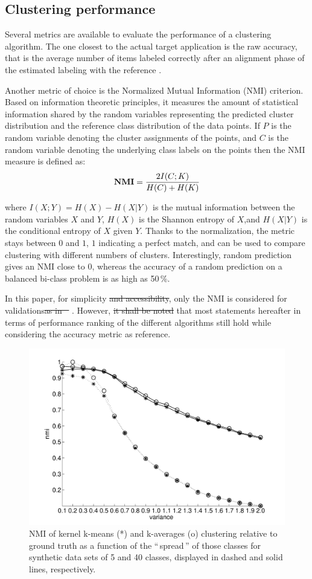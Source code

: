 \documentclass[natbib,smallextended]{svjour3}
\newcommand{\gl}[1]{``\,#1\,''} %
\providecommand{\DIFaddtex}[1]{{\protect\color{blue}\uwave{#1}}} %
\providecommand{\DIFdeltex}[1]{{\protect\color{red}\sout{#1}}}                      %
\providecommand{\DIFaddbegin}{} %
\providecommand{\DIFaddend}{} %
\providecommand{\DIFdelbegin}{} %
\providecommand{\DIFdelend}{} %
\providecommand{\DIFadd}[1]{\texorpdfstring{\DIFaddtex{#1}}{#1}} %
\providecommand{\DIFdel}[1]{\texorpdfstring{\DIFdeltex{#1}}{}} %
\begin{document}
\subsection{Clustering performance}

Several metrics are available to evaluate the performance of a clustering algorithm. The one closest to the actual target application is the raw accuracy, that is the average number of items labeled correctly after an alignment phase of the estimated labeling with the reference \citep{Kuhn1955Hungarian}.

Another metric of choice is the Normalized Mutual Information (NMI) criterion. Based on information theoretic principles, it measures the amount of statistical information shared by the random variables representing the predicted cluster distribution and the reference class distribution of the data points. If $P$ is the random variable denoting the cluster assignments of the points, and $C$ is the random variable denoting the underlying class labels on the points then the NMI measure is defined as:
\[
\textbf{NMI} = \frac{ 2\- I(C;K) }{H(C)+H(K)}
\]

where $I(X;Y)=H(X)−H(X|Y)$ is the mutual information between the random variables $X$ and $Y$, $H(X)$ is the Shannon entropy of $X$,and $H(X|Y)$ is the conditional entropy of $X$ given $Y$. Thanks to the normalization, the metric stays between $0$ and $1$, $1$ indicating a perfect match, and can be used to compare clustering with different numbers of clusters. Interestingly, random prediction gives an NMI close to $0$, whereas the accuracy of a random prediction on a balanced bi-class problem is as high as 50\,\%.

In this paper, for simplicity \DIFdelbegin \DIFdel{and accessibility}\DIFdelend \DIFaddbegin \DIFadd{sake}\DIFaddend , only the NMI is considered for validations\DIFdelbegin \DIFdel{as in \mbox{%
\citep{Kulis2008}}%
}\DIFdelend . However, \DIFdelbegin \DIFdel{it shall be noted }\DIFdelend \DIFaddbegin \DIFadd{we found }\DIFaddend that most statements hereafter in terms of performance ranking of the different algorithms still hold while considering the accuracy metric as reference.

\begin{figure}
\center
\includegraphics[width=.7\textwidth]{figures/synthetic.pdf}
\caption{NMI of kernel k-means (*) and k-averages (o) clustering relative to ground truth as a function of the \gl{spread} of those classes for synthetic data sets of 5 and 40 classes, displayed in dashed and solid lines, respectively.}
\label{fig:synth_perf}
\end{figure}
\end{document}
